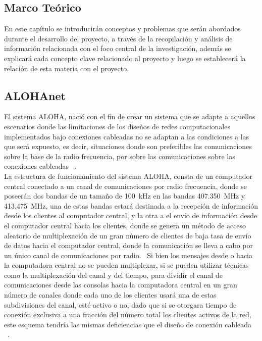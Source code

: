\begin{justify}
\chapter[Marco Teórico]{Marco Teórico}
\label{ch:marcoteorico}
En este capítulo se introducirán conceptos y problemas que serán abordados durante el desarrollo del proyecto, a través de la recopilación y análisis de información relacionada con el foco central de la investigación, además se explicará cada concepto clave relacionado al proyecto y luego se establecerá la relación de esta materia con el proyecto.

\section{ALOHAnet}
El sistema ALOHA, nació con el fin de crear un sistema que se adapte a aquellos escenarios donde las limitaciones de los diseños de redes computacionales implementados bajo conexiones cableadas no se adaptan a las condiciones a las que será expuesto, es decir, situaciones donde son preferibles las comunicaciones sobre la base de la radio frecuencia, por sobre las comunicaciones sobre las conexiones cableadas ~\cite{NORMAN}.\\
La estructura de funcionamiento del sistema ALOHA, consta de un computador central conectado a un canal de comunicaciones por radio frecuencia, donde se poseerán dos bandas de un tamaño de \SI{100}{\kilo\hertz} en las bandas \SI{407.350}{\mega\hertz} y \SI{413.475}{\mega\hertz}, una de estas bandas estará destinada a la recepción de información desde los clientes al computador central, y la otra a el envío de información desde el computador central hacia los clientes, donde se genera un método de acceso aleatorio de multiplexación de un gran número de clientes de baja tasa de envío de datos hacia el computador central, donde la comunicación se lleva a cabo por un único canal de comunicaciones por radio.~\cite{NORMAN} Si bien los mensajes desde o hacia la computadora central no se pueden multiplexar, si se pueden utilizar técnicas como la multiplexación del canal y del tiempo, para dividir el canal de comunicaciones desde las consolas hacia la computadora central en un gran número de canales donde cada uno de los clientes usará una de estas subdivisiones del canal, esté activo o no, dado que si se otorgara tiempo de conexión exclusiva a una fracción del número total los clientes activos de la red, este esquema tendría las mismas deficiencias que el diseño de conexión cableada ~\cite{Abdullah}.\\

\end{justify}
